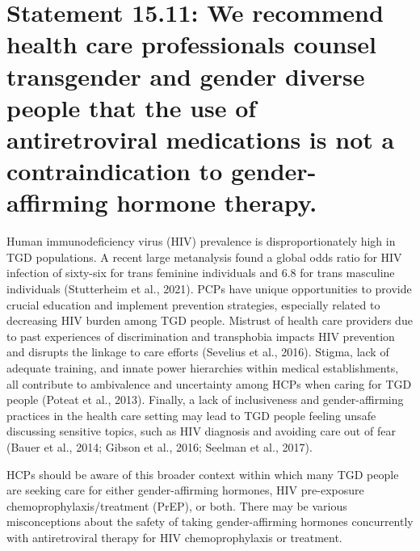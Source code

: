 \documentclass[
]{book}
\begin{document}
\hypertarget{statement-15.11-we-recommend-health-care-professionals-counsel-transgender-and-gender-diverse-people-that-the-use-of-antiretroviral-medications-is-not-a-contraindication-to-gender-affirming-hormone-therapy.}{%
\section*{Statement 15.11: We recommend health care professionals counsel transgender and gender diverse people that the use of antiretroviral medications is not a contraindication to gender-affirming hormone therapy.}\label{statement-15.11-we-recommend-health-care-professionals-counsel-transgender-and-gender-diverse-people-that-the-use-of-antiretroviral-medications-is-not-a-contraindication-to-gender-affirming-hormone-therapy.}}

Human immunodeficiency virus (HIV) prevalence is disproportionately high in TGD
populations. A recent large metanalysis found a
global odds ratio for HIV infection of sixty-six
for trans feminine individuals and 6.8 for trans
masculine individuals (Stutterheim et al., 2021).
PCPs have unique opportunities to provide crucial education and implement prevention strategies, especially related to decreasing HIV
burden among TGD people. Mistrust of health
care providers due to past experiences of discrimination and transphobia impacts HIV prevention and disrupts the linkage to care efforts
(Sevelius et al., 2016). Stigma, lack of adequate
training, and innate power hierarchies within
medical establishments, all contribute to ambivalence and uncertainty among HCPs when caring for TGD people (Poteat et al., 2013). Finally,
a lack of inclusiveness and gender-affirming
practices in the health care setting may lead to
TGD people feeling unsafe discussing sensitive
topics, such as HIV diagnosis and avoiding care
out of fear (Bauer et al., 2014; Gibson et al.,
2016; Seelman et al., 2017).

HCPs should be aware of this broader context
within which many TGD people are seeking care
for either gender-affirming hormones, HIV
pre-exposure chemoprophylaxis/treatment (PrEP),
or both. There may be various misconceptions
about the safety of taking gender-affirming hormones concurrently with antiretroviral therapy
for HIV chemoprophylaxis or treatment.
\end{document}
